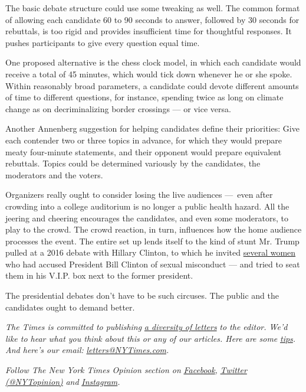 The basic debate structure could use some tweaking as well. The common
format of allowing each candidate 60 to 90 seconds to answer, followed
by 30 seconds for rebuttals, is too rigid and provides insufficient time
for thoughtful responses. It pushes participants to give every question
equal time.

One proposed alternative is the chess clock model, in which each
candidate would receive a total of 45 minutes, which would tick down
whenever he or she spoke. Within reasonably broad parameters, a
candidate could devote different amounts of time to different questions,
for instance, spending twice as long on climate change as on
decriminalizing border crossings --- or vice versa.

Another Annenberg suggestion for helping candidates define their
priorities: Give each contender two or three topics in advance, for
which they would prepare meaty four-minute statements, and their
opponent would prepare equivalent rebuttals. Topics could be determined
variously by the candidates, the moderators and the voters.

Organizers really ought to consider losing the live audiences ---~even
after crowding into a college auditorium is no longer a public health
hazard. All the jeering and cheering encourages the candidates, and even
some moderators, to play to the crowd. The crowd reaction, in turn,
influences how the home audience processes the event. The entire set up
lends itself to the kind of stunt Mr. Trump pulled at a 2016 debate with
Hillary Clinton, to which he invited
\href{https://www.nytimes3xbfgragh.onion/2016/10/11/us/politics/bill-clinton-accusers-debate.html}{several
women} who had accused President Bill Clinton of sexual misconduct ---
and tried to seat them in his V.I.P. box next to the former president.

The presidential debates don't have to be such circuses. The public and
the candidates ought to demand better.

\emph{The Times is committed to publishing}
\href{https://www.nytimes3xbfgragh.onion/2019/01/31/opinion/letters/letters-to-editor-new-york-times-women.html}{\emph{a
diversity of letters}} \emph{to the editor. We'd like to hear what you
think about this or any of our articles. Here are some}
\href{https://help.nytimes3xbfgragh.onion/hc/en-us/articles/115014925288-How-to-submit-a-letter-to-the-editor}{\emph{tips}}\emph{.
And here's our email:}
\href{mailto:letters@NYTimes.com}{\emph{letters@NYTimes.com}}\emph{.}

\emph{Follow The New York Times Opinion section on}
\href{https://www.facebookcorewwwi.onion/nytopinion}{\emph{Facebook}}\emph{,}
\href{http://twitter.com/NYTOpinion}{\emph{Twitter (@NYTopinion)}}
\emph{and}
\href{https://www.instagram.com/nytopinion/}{\emph{Instagram}}\emph{.}

